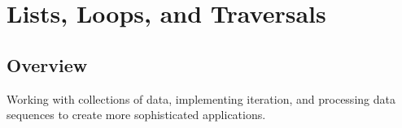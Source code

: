\chapter{Lists, Loops, and Traversals}

\section*{Overview}
Working with collections of data, implementing iteration, and processing data sequences to create more sophisticated applications.

